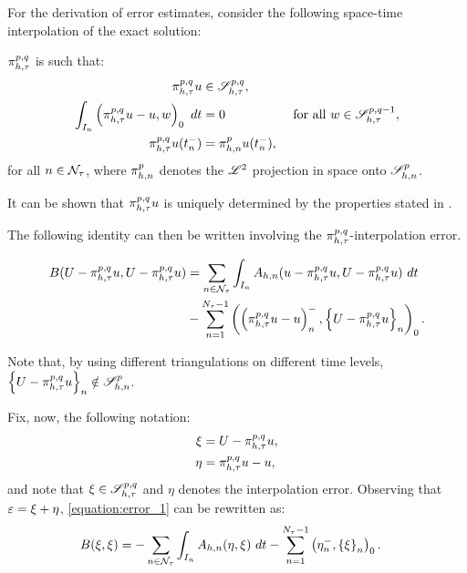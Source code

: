For the derivation of error estimates, consider the following space-time interpolation of the exact solution:

\begin{definition}[$\InterpolantPQ$] \label{definition:interpolant_qp}
    $\InterpolantPQ$ is such that:
    \begin{align}
        \pi_{h, \tau}^{p, q} u &\in \mathscr{S}^{p, q}_{h, \tau}, \\
        \int_{I_n} \left( \pi_{h, \tau}^{p, q} u - u, w \right)_0 ~ dt &= 0 &\text{ for all } w \in \mathscr{S}^{p, q - 1}_{h, \tau}, \label{eq:interpolation_result} \\
        \pi_{h, \tau}^{p, q} u(t_n^-) &= \pi_{h, n}^p u(t_n^-), \label{eq:interpolation_result_2}
    \end{align}
    for all $n \in \mathcal{N}_{\tau}$, where $\pi_{h, n}^p$ denotes the $\mathscr{L}^{2}$ projection in space onto $\mathscr{S}^p_{h, n}$.
\end{definition}

It can be shown that $\pi_{h, \tau}^{p, q} u$ is uniquely determined by the properties stated in .

The following identity can then be written involving the $\InterpolantPQ$-interpolation error.

\begin{lemma}
    \begin{align}
        B(U - \pi_{h, \tau}^{p, q} u, U - \pi_{h, \tau}^{p, q} u) &= \sum_{n \in \mathcal{N}_{\tau}} \int_{I_n} A_{h, n}(u - \pi_{h, \tau}^{p, q} u, U - \pi_{h, \tau}^{p, q} u) ~ dt \label{equation:error_1} \\
        &- \sum_{n = 1}^{N_{\tau} - 1} \left( \left( \pi_{h, \tau}^{p, q} u - u \right)_n^-, \left\{ U - \pi_{h, \tau}^{p, q} u \right\}_n \right)_0. \notag
    \end{align}
\end{lemma}

Note that, by using different triangulations on different time levels, $\left\{ U - \pi_{h, \tau}^{p, q} u \right\}_n \notin \mathscr{S}^p_{h, n}$.

Fix, now, the following notation:
\begin{align}
    \xi &= U - \pi_{h, \tau}^{p, q} u, \\
    \eta &= \pi_{h, \tau}^{p, q} u - u,
\end{align}
and note that $\xi \in \mathscr{S}^{p, q}_{h, \tau}$ and $\eta$ denotes the interpolation error. Observing that $\varepsilon = \xi + \eta$, \cref{equation:error_1} can be rewritten as:
\begin{align}
    B(\xi, \xi) &= - \sum_{n \in \mathcal{N}_{\tau}} \int_{I_n} A_{h, n}(\eta, \xi) ~ dt - \sum_{n = 1}^{N_{\tau} - 1} \left( \eta_n^-, \left\{ \xi \right\}_n \right)_0. \label{equation:error_2}
\end{align}

